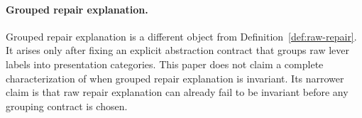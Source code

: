 \paragraph{Grouped repair explanation.}
Grouped repair explanation is a different object from Definition~\ref{def:raw-repair}.
It arises only after fixing an explicit abstraction contract that groups raw lever labels into presentation categories.
This paper does not claim a complete characterization of when grouped repair explanation is invariant.
Its narrower claim is that raw repair explanation can already fail to be invariant before any grouping contract is chosen.
